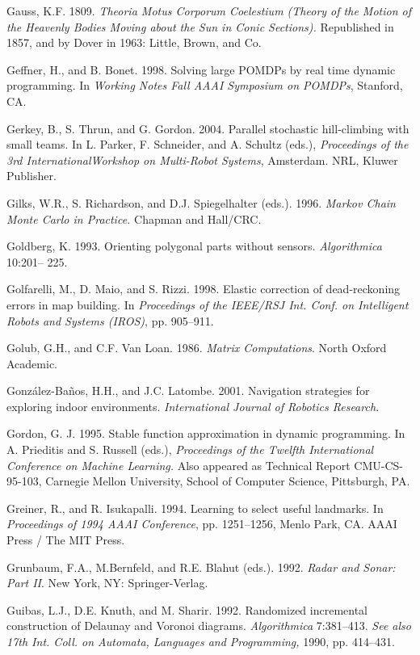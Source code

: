 \documentclass[10pt,a4paper]{article}
\begin{document}
Gauss, K.F. 1809. \textit{Theoria Motus Corporum Coelestium (Theory of the Motion of the Heavenly
Bodies Moving about the Sun in Conic Sections).} Republished in 1857, and by
Dover in 1963: Little, Brown, and Co.

Geffner, H., and B. Bonet. 1998. Solving large POMDPs by real time dynamic programming.
In\textit{ Working Notes Fall AAAI Symposium on POMDPs}, Stanford, CA.

Gerkey, B., S. Thrun, and G. Gordon. 2004. Parallel stochastic hill-climbing with
small teams. In L. Parker, F. Schneider, and A. Schultz (eds.), \textit{Proceedings of the 3rd
InternationalWorkshop on Multi-Robot Systems}, Amsterdam. NRL, Kluwer Publisher.

Gilks, W.R., S. Richardson, and D.J. Spiegelhalter (eds.). 1996. \textit{Markov Chain Monte
Carlo in Practice.} Chapman and Hall/CRC.

Goldberg, K. 1993. Orienting polygonal parts without sensors. \textit{Algorithmica} 10:201–
225.

Golfarelli, M., D. Maio, and S. Rizzi. 1998. Elastic correction of dead-reckoning errors
in map building. In \textit{Proceedings of the IEEE/RSJ Int. Conf. on Intelligent Robots and
Systems (IROS)}, pp. 905–911.

Golub, G.H., and C.F. Van Loan. 1986. \textit{Matrix Computations}. North Oxford Academic.

González-Baños, H.H., and J.C. Latombe. 2001. Navigation strategies for exploring
indoor environments. \textit{International Journal of Robotics Research.}

Gordon, G. J. 1995. Stable function approximation in dynamic programming. In
A. Prieditis and S. Russell (eds.), \textit{Proceedings of the Twelfth International Conference
on Machine Learning.} Also appeared as Technical Report CMU-CS-95-103, Carnegie
Mellon University, School of Computer Science, Pittsburgh, PA.

Greiner, R., and R. Isukapalli. 1994. Learning to select useful landmarks. In \textit{Proceedings
of 1994 AAAI Conference}, pp. 1251–1256, Menlo Park, CA. AAAI Press / The
MIT Press.

Grunbaum, F.A., M.Bernfeld, and R.E. Blahut (eds.). 1992. \textit{Radar and Sonar: Part II}.
New York, NY: Springer-Verlag.

Guibas, L.J., D.E. Knuth, and M. Sharir. 1992. Randomized incremental construction
of Delaunay and Voronoi diagrams. \textit{Algorithmica} 7:381–413. \textit{See also 17th Int. Coll.
on Automata, Languages and Programming,} 1990, pp. 414–431.
\end{document}
